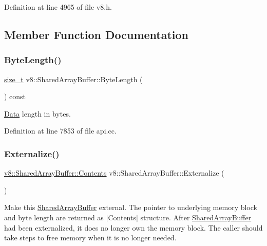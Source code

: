 Definition at line 4965 of file v8.\+h.



\subsection{Member Function Documentation}
\mbox{\label{classv8_1_1SharedArrayBuffer_a746f2632ad6c2d80e8f2e5e6e5b77f94}} 
\subsubsection{\texorpdfstring{Byte\+Length()}{ByteLength()}}
{\footnotesize\ttfamily \mbox{\hyperlink{classsize__t}{size\+\_\+t}} v8\+::\+Shared\+Array\+Buffer\+::\+Byte\+Length (\begin{DoxyParamCaption}{ }\end{DoxyParamCaption}) const}

\mbox{\hyperlink{classv8_1_1Data}{Data}} length in bytes. 

Definition at line 7853 of file api.\+cc.

\mbox{\label{classv8_1_1SharedArrayBuffer_a5e3308ea38c81c37d5c3fc08fc1a6696}} 
\subsubsection{\texorpdfstring{Externalize()}{Externalize()}}
{\footnotesize\ttfamily \mbox{\hyperlink{classv8_1_1SharedArrayBuffer_1_1Contents}{v8\+::\+Shared\+Array\+Buffer\+::\+Contents}} v8\+::\+Shared\+Array\+Buffer\+::\+Externalize (\begin{DoxyParamCaption}{ }\end{DoxyParamCaption})}

Make this \mbox{\hyperlink{classv8_1_1SharedArrayBuffer}{Shared\+Array\+Buffer}} external. The pointer to underlying memory block and byte length are returned as $\vert$\+Contents$\vert$ structure. After \mbox{\hyperlink{classv8_1_1SharedArrayBuffer}{Shared\+Array\+Buffer}} had been externalized, it does no longer own the memory block. The caller should take steps to free memory when it is no longer needed.

